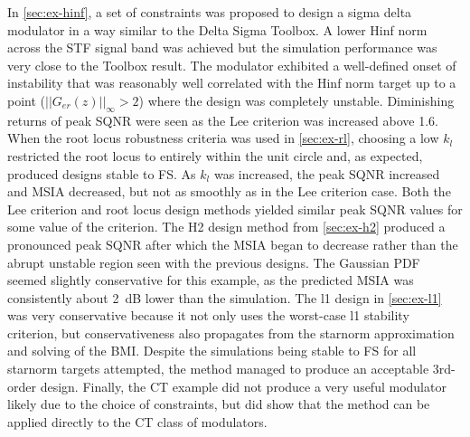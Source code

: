 In \autoref{sec:ex-hinf}, a set of constraints was proposed to design a sigma delta modulator in a way similar to the Delta Sigma Toolbox. A lower \gls{Hinf} norm across the \gls{STF} signal band was achieved but the simulation performance was very close to the Toolbox result. The modulator exhibited a well-defined onset of instability that was reasonably well correlated with the \gls{Hinf} norm target up to a point ($||G_{er}(z)||_\infty > 2$) where the design was completely unstable. Diminishing returns of peak \gls{SQNR} were seen as the Lee criterion was increased above 1.6.  When the root locus robustness criteria was used in \autoref{sec:ex-rl}, choosing a low $k_l$ restricted the root locus to entirely within the unit circle and, as expected, produced designs stable to \gls{FS}. As $k_l$ was increased, the peak \gls{SQNR} increased and \gls{MSIA} decreased, but not as smoothly as in the Lee criterion case. Both the Lee criterion and root locus design methods yielded similar peak \gls{SQNR} values for some value of the criterion. The \gls{H2} design method from \autoref{sec:ex-h2} produced a pronounced peak \gls{SQNR} after which the \gls{MSIA} began to decrease rather than the abrupt unstable region seen with the previous designs. The Gaussian \gls{PDF} seemed slightly conservative for this example, as the predicted \gls{MSIA} was consistently about \SI{2}{\deci\bel} lower than the simulation. The \gls{l1} design in \autoref{sec:ex-l1} was very conservative because it not only uses the worst-case \gls{l1} stability criterion, but conservativeness also propagates from the \gls{starnorm} approximation and solving of the \gls{BMI}. Despite the simulations being stable to \gls{FS} for all \gls{starnorm} targets attempted, the method managed to produce an acceptable 3rd-order design. Finally, the \gls{CT} example did not produce a very useful modulator likely due to the choice of constraints, but did show that the method can be applied directly to the \gls{CT} class of modulators.